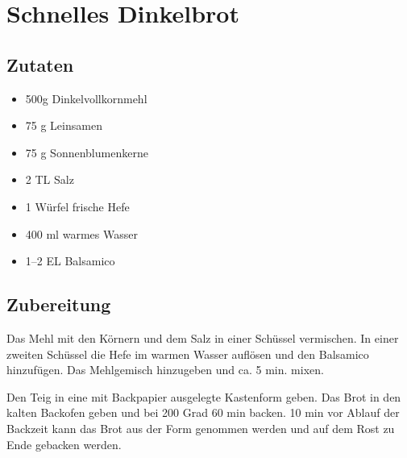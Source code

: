 \def\mytitle{Schnelles Dinkelbrot}
\def\myauthor{Matthias}
\def\mydate{March, 2013}
\part{Schnelles Dinkelbrot}
\label{schnellesdinkelbrot}

\chapter{Zutaten}
\label{zutaten}

\begin{itemize}
\item 500g Dinkelvollkornmehl

\item 75 g Leinsamen

\item 75 g Sonnenblumenkerne

\item 2 TL Salz

\item 1 Würfel frische Hefe

\item 400 ml warmes Wasser

\item 1--2 EL Balsamico

\end{itemize}

\chapter{Zubereitung}
\label{zubereitung}

Das Mehl mit den Körnern und dem Salz in einer Schüssel vermischen.
In einer zweiten Schüssel die Hefe im warmen Wasser auflösen und den Balsamico hinzufügen.
Das Mehlgemisch hinzugeben und ca. 5 min. mixen.

Den Teig in eine mit Backpapier ausgelegte Kastenform geben.
Das Brot in den kalten Backofen geben und bei 200 Grad 60 min backen.
10 min vor Ablauf der Backzeit kann das Brot aus der Form genommen werden und auf dem Rost zu Ende gebacken werden.

